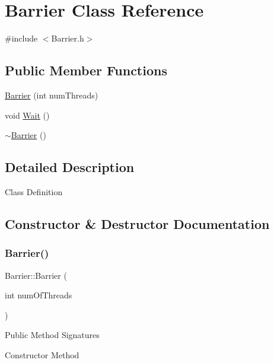 \hypertarget{class_barrier}{}\section{Barrier Class Reference}
\label{class_barrier}


{\ttfamily \#include $<$Barrier.\+h$>$}

\subsection*{Public Member Functions}
\begin{DoxyCompactItemize}
\item 
\hyperlink{class_barrier_a7290fb8952d0f7779b8d6a7a34bbd407}{Barrier} (int num\+Threads)
\item 
void \hyperlink{class_barrier_a7de2afc6097b37c051d864bdf694c7e0}{Wait} ()
\item 
\hyperlink{class_barrier_a401f40e73302009b305904ffc7825304}{$\sim$\+Barrier} ()
\end{DoxyCompactItemize}


\subsection{Detailed Description}
Class Definition 

\subsection{Constructor \& Destructor Documentation}
\mbox{\label{class_barrier_a7290fb8952d0f7779b8d6a7a34bbd407}} 
\subsubsection{\texorpdfstring{Barrier()}{Barrier()}}
{\footnotesize\ttfamily Barrier\+::\+Barrier (\begin{DoxyParamCaption}\item[{int}]{num\+Of\+Threads }\end{DoxyParamCaption})}

Public Method Signatures

Constructor Method \mbox{\label{class_barrier_a401f40e73302009b305904ffc7825304}} 
